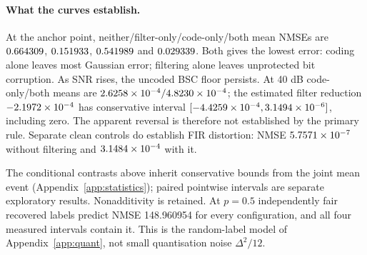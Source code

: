 \noindent\begin{minipage}{\linewidth}
\paragraph{What the curves establish.}
At the anchor point, neither/filter-only/code-only/both mean NMSEs are
$0.664309 $, $0.151933 $, $0.541989 $ and
$0.029339 $. Both gives the lowest error: coding alone leaves most
Gaussian error; filtering alone leaves unprotected bit corruption.
As SNR rises, the uncoded BSC floor persists. At 40 dB code-only/both means
are $2.6258\times10^{-4}/4.8230\times10^{-4} $; the estimated filter reduction
$-2.1972\times10^{-4} $ has conservative interval
$[-4.4259\times10^{-4},3.1494\times10^{-6}]$, including zero.
The apparent reversal is therefore not established by the primary rule.
Separate clean controls do establish FIR distortion: NMSE
$5.7571\times10^{-7} $ without filtering and $3.1484\times10^{-4} $ with it.
\end{minipage}\par

\begin{table}[htbp]
 \centering\small
 \caption{Conditional NMSE reductions and interaction at the anchor/high-SNR points. Positive reductions improve quality; conservative intervals retain negative and unresolved effects.}
 \label{tab:r43-effects}
 
 
 
\end{table}

The conditional contrasts above inherit conservative bounds from the
joint mean event (Appendix~\ref{app:statistics}); paired pointwise
intervals are separate exploratory results. Nonadditivity is retained.
At $ p=0.5 $ independently fair recovered labels predict NMSE 148.960954
for every configuration, and all four measured intervals contain it.
This is the random-label model of Appendix~\ref{app:quant}, not small
quantisation noise $\Delta^2/12 $.

\begin{table}[htbp]
 \centering\small
 \caption{Twelve-condition equal-weight objective from 1400 independent bundle scores. Intervals belong to the 92-statistic family; weights are design choices, not channel frequencies.}
 \label{tab:r43-objective}
 
 
 
\end{table}

